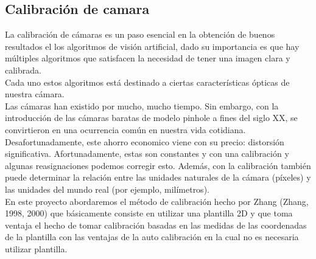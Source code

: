 \subsection{Calibración de camara}
La calibración de cámaras es un paso esencial en la obtención de buenos resultados
el los algoritmos de visión artificial, dado su importancia es que hay múltiples
algoritmos que satisfacen la necesidad de tener una imagen clara y calibrada.\\
Cada uno estos algoritmos está destinado a ciertas características ópticas de nuestra
cámara.\\
Las cámaras han existido por mucho, mucho tiempo. Sin embargo, con la introducción de
las cámaras baratas de modelo pinhole a fines del siglo XX, se convirtieron en una
ocurrencia común en nuestra vida cotidiana. Desafortunadamente, este ahorro economico viene
con su precio: distorsión significativa. Afortunadamente, estas son constantes y con
una calibración y algunas reasignaciones podemos corregir esto. Además,
con la calibración también puede determinar la relación entre las unidades naturales
de la cámara (píxeles) y las unidades del mundo real (por ejemplo, milímetros).\cite{WEB:OpencvCalibracion}\\
En este proyecto abordaremos el método de calibración hecho por Zhang (Zhang, 1998, 2000)
que básicamente consiste en utilizar una plantilla 2D y que toma ventaja el hecho de tomar
calibración basadas en las medidas de
las coordenadas de la plantilla con las ventajas de la
auto calibración en la cual no es necesaria utilizar
plantilla.
